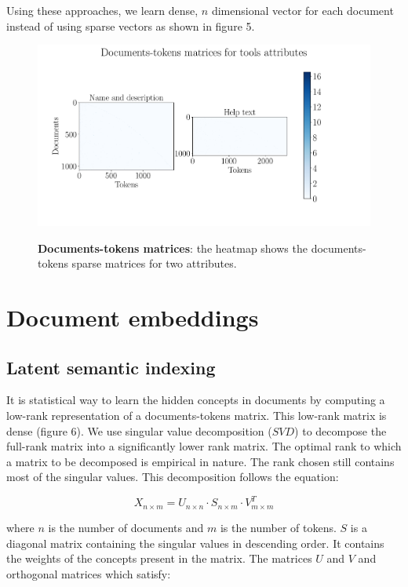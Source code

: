 Using these approaches, we learn dense, $n$ dimensional vector for each document instead of using sparse vectors as shown in figure 5. 

\begin{figure}[h]
\begin{centering}
    {\includegraphics[scale=0.45]{figures/Document_tokens_full_rank.pdf}}
    \caption[Documents-tokens matrices]{\textbf{Documents-tokens matrices}: the heatmap shows the documents-tokens sparse matrices for two attributes.}
\end{centering}
\end{figure}

    
\section{Document embeddings}
\subsection{Latent semantic indexing}
    It is statistical way to learn the hidden concepts in documents by computing a low-rank representation of a documents-tokens matrix. This low-rank matrix is dense (figure 6). We use singular value decomposition ($SVD$) to decompose the full-rank matrix into a significantly lower rank matrix. The optimal rank to which a matrix to be decomposed is empirical in nature. The rank chosen still contains most of the singular values. This decomposition follows the equation:
    
    \begin{equation}
    X_{n \times m} = U_{n \times n} \cdot S_{n \times m} \cdot V_{m \times m}^T
    \end{equation}
    
    where $n$ is the number of documents and $m$ is the number of tokens. $S$ is a diagonal matrix containing the singular values in descending order. It contains the weights of the concepts present in the matrix. The matrices $U$ and $V$ and orthogonal matrices which satisfy:
    
